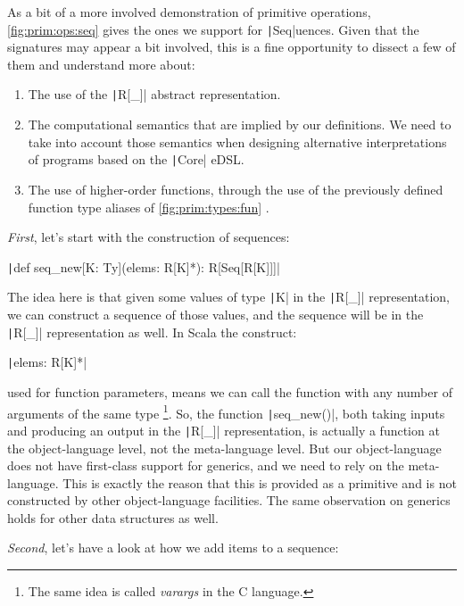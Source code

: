 \documentclass[11pt]{article}
\renewcommand{\vref}[1]{\autoref{#1} \vpageref{#1}}{}
\newcommand{\ScalaI}[1]{\texttt|#1|}
\newcommand{\OneTwoThreeX}[1]{\marginpar{\faCubes{ \smaller #1}}\xspace}
\newcommand{\OneTwoThree}{\OneTwoThreeX{}}
\newcommand{\FirstEtcX}[1]{\marginpar{\faCube{ \smaller #1}}\xspace}
\newcommand{\FirstEtc}{\FirstEtcX{}}
\begin{document}
As a bit of a more involved demonstration of primitive operations, 
\vref{fig:prim:ops:seq} gives the ones we support for \ScalaI{Seq}uences. 
Given that the signatures may appear a bit involved, this is a fine 
opportunity to dissect a few of them and understand more\OneTwoThree about:
\begin{enumerate}
  \item The use of the \ScalaI{R[_]} abstract representation.

  \item The computational semantics that are implied by our definitions. We 
  need to take into account those semantics when designing alternative 
  interpretations of programs based on the \ScalaI{Core} eDSL.
  
  \item The use of higher-order functions, through the use of the previously 
  defined function type aliases of \vref{fig:prim:types:fun}.
\end{enumerate}

\textit{First}\FirstEtc, let's start with the construction of sequences:

\par\ScalaI{def seq_new[K: Ty](elems: R[K]*): R[Seq[R[K]]]}

\noindent The idea here is that given some values of type \ScalaI{K} in the 
\ScalaI{R[_]} representation, we can construct a sequence of those values, 
and the sequence will be in the \ScalaI{R[_]} representation as well. In 
Scala the construct:

\par\ScalaI{elems: R[K]*}

\noindent used for function parameters, means we can call the function with 
any number of arguments of the same type%
\footnote{The same idea is called \textit{varargs} in the C language.}.
So, the function \ScalaI{seq_new()}, both taking inputs and producing an 
output in the \ScalaI{R[_]} representation, is actually a function at the 
object-language level, not the meta-language level. But our object-language 
does not have first-class support for generics, and we need to rely on the 
meta-language. This is exactly the reason that this is provided as a 
primitive and is not constructed by other object-language facilities. The 
same observation on generics holds for other data structures as well.

\textit{Second}\FirstEtc, let's have a look at how we add items to a sequence:
\end{document}
